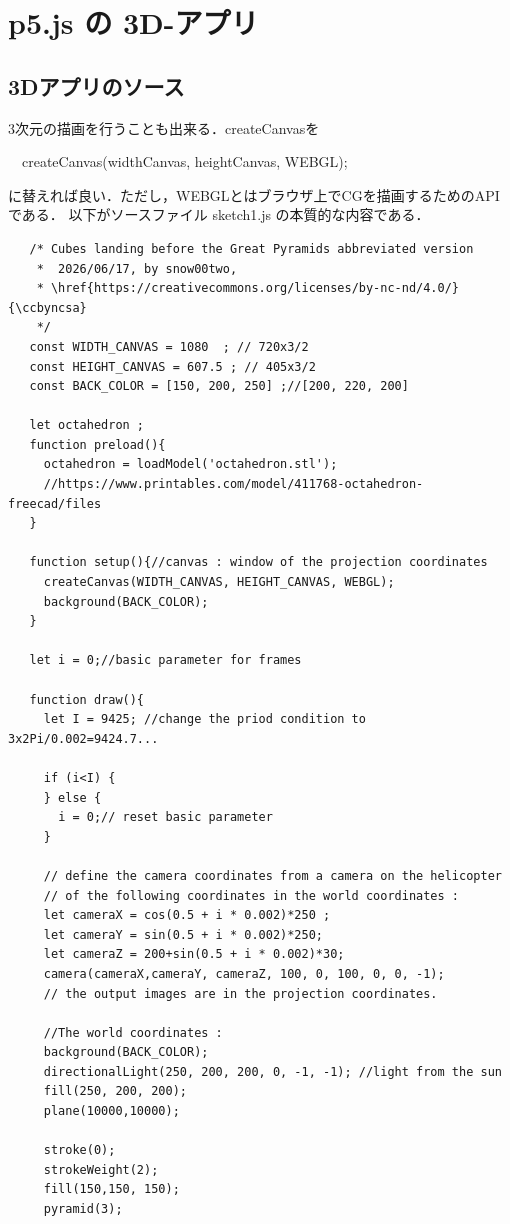 \section{ p5.js の 3D-アプリ}
\subsection{3Dアプリのソース}
$3$次元の描画を行うことも出来る．createCanvasを

　createCanvas(widthCanvas, heightCanvas, WEBGL);

\noindent
に替えれば良い．ただし，WEBGLとはブラウザ上でCGを描画するためのAPIである．
以下がソースファイル sketch1.js の本質的な内容である．

\begin{verbatim}
   /* Cubes landing before the Great Pyramids abbreviated version
    *  2026/06/17, by snow00two,
    * \href{https://creativecommons.org/licenses/by-nc-nd/4.0/}{\ccbyncsa}
    */
   const WIDTH_CANVAS = 1080  ; // 720x3/2 
   const HEIGHT_CANVAS = 607.5 ; // 405x3/2
   const BACK_COLOR = [150, 200, 250] ;//[200, 220, 200]
   
   let octahedron ; 
   function preload(){
     octahedron = loadModel('octahedron.stl'); 
     //https://www.printables.com/model/411768-octahedron-freecad/files
   }
   
   function setup(){//canvas : window of the projection coordinates
     createCanvas(WIDTH_CANVAS, HEIGHT_CANVAS, WEBGL);
     background(BACK_COLOR);
   }
   
   let i = 0;//basic parameter for frames
   
   function draw(){
     let I = 9425; //change the priod condition to 3x2Pi/0.002=9424.7... 
   
     if (i<I) {
     } else {
       i = 0;// reset basic parameter
     }
   
     // define the camera coordinates from a camera on the helicopter
     // of the following coordinates in the world coordinates : 
     let cameraX = cos(0.5 + i * 0.002)*250 ;
     let cameraY = sin(0.5 + i * 0.002)*250;
     let cameraZ = 200+sin(0.5 + i * 0.002)*30;
     camera(cameraX,cameraY, cameraZ, 100, 0, 100, 0, 0, -1);
     // the output images are in the projection coordinates.
   
     //The world coordinates : 
     background(BACK_COLOR);
     directionalLight(250, 200, 200, 0, -1, -1); //light from the sun 
     fill(250, 200, 200);
     plane(10000,10000);
   
     stroke(0);
     strokeWeight(2);
     fill(150,150, 150);
     pyramid(3);
   

\end{verbatim}

